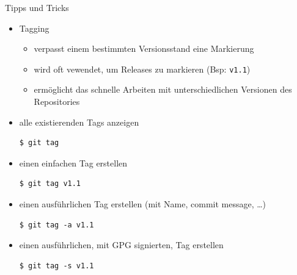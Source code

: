 \begin{frame}[fragile]{Tipps und Tricks}
  \begin{itemize}
    \item Tagging
    \begin{itemize}
      \item verpasst einem bestimmten Versionsstand eine Markierung
      \item wird oft vewendet, um Releases zu markieren (Bsp: \texttt{v1.1})
      \item ermöglicht das schnelle Arbeiten mit unterschiedlichen Versionen des Repositories
    \end{itemize}
  \item alle existierenden Tags anzeigen
    \begin{lstlisting}
$ git tag
    \end{lstlisting}
  \item einen einfachen Tag erstellen
    \begin{lstlisting}
$ git tag v1.1
    \end{lstlisting}
  \item einen ausführlichen Tag erstellen (mit Name, commit message, \ldots)
    \begin{lstlisting}
$ git tag -a v1.1
    \end{lstlisting}
  \item einen ausführlichen, mit GPG signierten, Tag erstellen
    \begin{lstlisting}
$ git tag -s v1.1
    \end{lstlisting}
  \end{itemize}
\end{frame}


